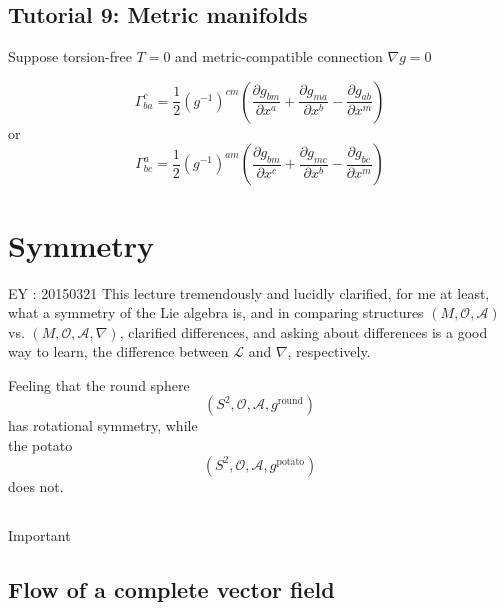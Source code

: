 	\subsection*{Tutorial 9: Metric manifolds}
	
	
	
	Suppose torsion-free $T=0$ and metric-compatible connection $\nabla g=0$
	
	
	
	
	
	
	
	\[
	\boxed{ \Gamma^c_{ba} = \frac{1}{2} (g^{-1})^{cm} \left( \frac{ \partial g_{bm} }{ \partial x^a} + \frac{ \partial g_{ma}}{ \partial x^b} - \frac{ \partial g_{ab}}{ \partial x^m} \right) }
	\]
	or 
	\[
	\Gamma^a_{bc} = \frac{1}{2} (g^{-1})^{am} \left( \frac{ \partial g_{bm}}{\partial x^c} + \frac{ \partial g_{mc}}{ \partial x^b} - \frac{ \partial g_{bc}}{ \partial x^m} \right)
	\]
	
	
	\section{Symmetry}
	
	EY : 20150321 This lecture tremendously and lucidly clarified, for me at least, what a symmetry of the Lie algebra is, and in comparing structures $(M,\mathcal{O}, \mathcal{A})$ vs. $(M,\mathcal{O}, \mathcal{A}, \nabla)$, clarified differences, and asking about differences is a good way to learn, the difference between $\mathcal{L}$ and $\nabla$, respectively.  
	
	Feeling that the round sphere
	\[
	(S^2, \mathcal{O}, \mathcal{A},g^{\text{round}})
	\]
	has rotational symmetry, while \\
	the potato
	\[
	(S^2, \mathcal{O},\mathcal{A}, g^{\text{potato}})
	\]
	does not.  
	
	\subsection{}
	
	\subsection{}
	
	Important
	
	\subsection{Flow of a complete vector field}
	
